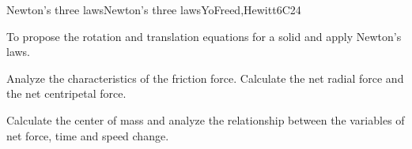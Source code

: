 \begin{syllabus}
\begin{unit}{Newton's three laws}{Newton's three laws}{YoFreed,Hewitt}{6}{C24}
      \begin{learningoutcomes}
         \item To propose the rotation and translation equations for a solid and apply Newton's laws. 
         \item Analyze the characteristics of the friction force. Calculate the net radial force and the net centripetal force.
         \item Calculate the center of mass and analyze the relationship between the variables of net force, time and speed change. 
      \end{learningoutcomes}
   \end{unit}

\begin{coursebibliography}
\end{coursebibliography}

\end{syllabus}
